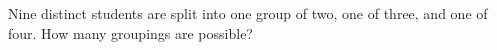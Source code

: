 Nine distinct students are split into one group of two, one of three, and one of four. How many groupings are possible?
